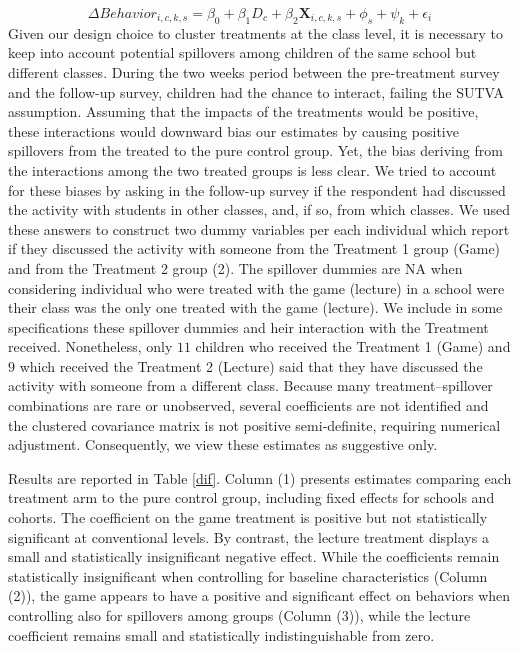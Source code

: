 \documentclass[preprint,12pt]{elsarticle}
\begin{document}
\[ \Delta Behavior_{i,c,k,s}= \beta_0 + \beta_1D_c+ \beta_2\textbf{X}_{i,c,k,s} + \phi_s + \psi_k + \epsilon_i\]
Given our design choice to cluster treatments at the class level, it is necessary to keep into account potential spillovers among children of the same school but different classes. During the two weeks period between the pre-treatment survey and the follow-up survey, children had the chance to interact, failing the SUTVA assumption. Assuming that the impacts of the treatments would be positive, these interactions would downward bias our estimates by causing positive spillovers from the treated to the pure control group. Yet, the bias deriving from the interactions among the two treated groups is less clear. We tried to account for these biases by asking in the follow-up survey if the respondent had discussed the activity with students in other classes, and, if so, from which classes. We used these answers to construct two dummy variables per each individual which report if they discussed the activity with someone from the Treatment 1 group (Game) and from the Treatment 2 group (2). The spillover dummies are NA when considering individual who were treated with the game (lecture) in a school were their class was the only one treated with the game (lecture). We include in some specifications these spillover dummies and heir interaction with the Treatment received. Nonetheless, only $11$ children who received the Treatment 1 (Game) and $9$ which received the Treatment 2 (Lecture) said that they have discussed the activity with someone from a different class. Because many treatment–spillover combinations are rare or unobserved, several coefficients are not identified and the clustered covariance matrix is not positive semi‑definite, requiring numerical adjustment. Consequently, we view these estimates as suggestive only.


Results are reported in Table \ref{dif}. Column (1) presents estimates comparing each treatment arm to the pure control group, including fixed effects for schools and cohorts. The coefficient on the game treatment is positive but not statistically significant at conventional levels. By contrast, the lecture treatment displays a small and statistically insignificant negative effect. While the coefficients remain statistically insignificant when controlling for baseline characteristics (Column (2)), the game appears to have a positive and significant effect on behaviors when controlling also for spillovers among groups (Column (3)), while the lecture coefficient remains small and statistically indistinguishable from zero.
\end{document}
